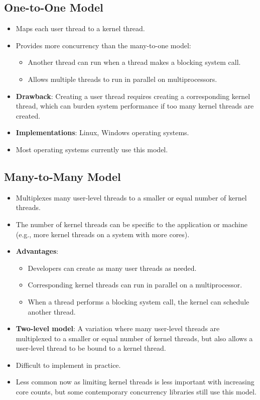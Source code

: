 \subsection{One-to-One Model}
\begin{itemize}
    \item Maps each user thread to a kernel thread.
    \item Provides more concurrency than the many-to-one model:
        \begin{itemize}
            \item Another thread can run when a thread makes a blocking system call.
            \item Allows multiple threads to run in parallel on multiprocessors.
        \end{itemize}
    \item \textbf{Drawback}: Creating a user thread requires creating a corresponding kernel thread, which can burden system performance if too many kernel threads are created.
    \item \textbf{Implementations}: Linux, Windows operating systems.
    \item Most operating systems currently use this model.
\end{itemize}

\subsection{Many-to-Many Model}
\begin{itemize}
    \item Multiplexes many user-level threads to a smaller or equal number of kernel threads.
    \item The number of kernel threads can be specific to the application or machine (e.g., more kernel threads on a system with more cores).
    \item \textbf{Advantages}:
        \begin{itemize}
            \item Developers can create as many user threads as needed.
            \item Corresponding kernel threads can run in parallel on a multiprocessor.
            \item When a thread performs a blocking system call, the kernel can schedule another thread.
        \end{itemize}
    \item \textbf{Two-level model}: A variation where many user-level threads are multiplexed to a smaller or equal number of kernel threads, but also allows a user-level thread to be bound to a kernel thread.
    \item Difficult to implement in practice.
    \item Less common now as limiting kernel threads is less important with increasing core counts, but some contemporary concurrency libraries still use this model.
\end{itemize}

